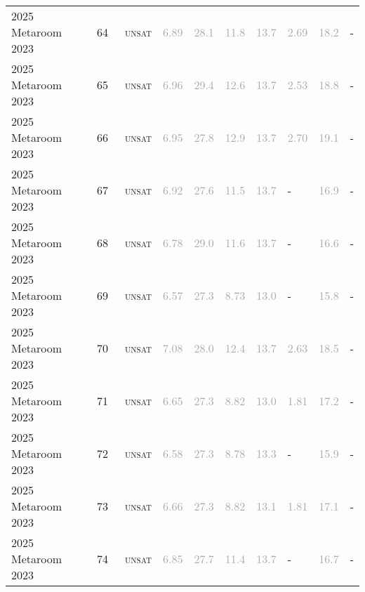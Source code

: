 \begin{center}
{\begin{longtable}{@{}llllllllll@{}}
2025 Metaroom 2023 & 64 & ~\textsc{unsat} & \textcolor{darkgray}{6.89} & \textcolor{darkgray}{28.1} & \textcolor{darkgray}{11.8} & \textcolor{darkgray}{13.7} & \textcolor{darkgray}{2.69} & \textcolor{darkgray}{18.2} & - \\
2025 Metaroom 2023 & 65 & ~\textsc{unsat} & \textcolor{darkgray}{6.96} & \textcolor{darkgray}{29.4} & \textcolor{darkgray}{12.6} & \textcolor{darkgray}{13.7} & \textcolor{darkgray}{2.53} & \textcolor{darkgray}{18.8} & - \\
2025 Metaroom 2023 & 66 & ~\textsc{unsat} & \textcolor{darkgray}{6.95} & \textcolor{darkgray}{27.8} & \textcolor{darkgray}{12.9} & \textcolor{darkgray}{13.7} & \textcolor{darkgray}{2.70} & \textcolor{darkgray}{19.1} & - \\
2025 Metaroom 2023 & 67 & ~\textsc{unsat} & \textcolor{darkgray}{6.92} & \textcolor{darkgray}{27.6} & \textcolor{darkgray}{11.5} & \textcolor{darkgray}{13.7} & - & \textcolor{darkgray}{16.9} & - \\
2025 Metaroom 2023 & 68 & ~\textsc{unsat} & \textcolor{darkgray}{6.78} & \textcolor{darkgray}{29.0} & \textcolor{darkgray}{11.6} & \textcolor{darkgray}{13.7} & - & \textcolor{darkgray}{16.6} & - \\
2025 Metaroom 2023 & 69 & ~\textsc{unsat} & \textcolor{darkgray}{6.57} & \textcolor{darkgray}{27.3} & \textcolor{darkgray}{8.73} & \textcolor{darkgray}{13.0} & - & \textcolor{darkgray}{15.8} & - \\
2025 Metaroom 2023 & 70 & ~\textsc{unsat} & \textcolor{darkgray}{7.08} & \textcolor{darkgray}{28.0} & \textcolor{darkgray}{12.4} & \textcolor{darkgray}{13.7} & \textcolor{darkgray}{2.63} & \textcolor{darkgray}{18.5} & - \\
2025 Metaroom 2023 & 71 & ~\textsc{unsat} & \textcolor{darkgray}{6.65} & \textcolor{darkgray}{27.3} & \textcolor{darkgray}{8.82} & \textcolor{darkgray}{13.0} & \textcolor{darkgray}{1.81} & \textcolor{darkgray}{17.2} & - \\
2025 Metaroom 2023 & 72 & ~\textsc{unsat} & \textcolor{darkgray}{6.58} & \textcolor{darkgray}{27.3} & \textcolor{darkgray}{8.78} & \textcolor{darkgray}{13.3} & - & \textcolor{darkgray}{15.9} & - \\
2025 Metaroom 2023 & 73 & ~\textsc{unsat} & \textcolor{darkgray}{6.66} & \textcolor{darkgray}{27.3} & \textcolor{darkgray}{8.82} & \textcolor{darkgray}{13.1} & \textcolor{darkgray}{1.81} & \textcolor{darkgray}{17.1} & - \\
2025 Metaroom 2023 & 74 & ~\textsc{unsat} & \textcolor{darkgray}{6.85} & \textcolor{darkgray}{27.7} & \textcolor{darkgray}{11.4} & \textcolor{darkgray}{13.7} & - & \textcolor{darkgray}{16.7} & - \\

\end{longtable}}
\end{center}
